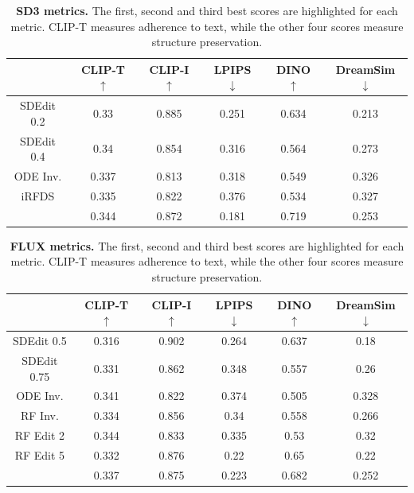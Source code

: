 \begin{table}[h]
\centering
\caption{\textbf{SD3 metrics.} The \colorbox{tabfirst}{first}, \colorbox{tabsecond}{second} and \colorbox{tabthird}{third} best scores are highlighted for each metric. CLIP-T measures adherence to text, while the other four scores measure structure preservation.}
\label{tab:metrics-sd3}
\begin{tabular}{@{}c|c|cccc@{}}
\toprule
 & CLIP-T $\uparrow$ & CLIP-I $\uparrow$ & LPIPS $\downarrow$ & DINO $\uparrow$ & DreamSim $\downarrow$ \\ \midrule
SDEdit 0.2 & 0.33  & \colorbox{tabfirst}{0.885}  & \colorbox{tabsecond}{0.251}  & \colorbox{tabsecond}{0.634} & \colorbox{tabfirst}{0.213}  \\
SDEdit 0.4 & \colorbox{tabsecond}{0.34}  & \colorbox{tabthird}{0.854}  & \colorbox{tabthird}{0.316}  & \colorbox{tabthird}{0.564} & \colorbox{tabthird}{0.273}  \\
ODE Inv. & \colorbox{tabthird}{0.337}  & 0.813  & 0.318  & 0.549  & 0.326  \\
iRFDS & 0.335 & 0.822 & 0.376 & 0.534 & 0.327
\\
\midrule
\textbf{\ours{}} & \colorbox{tabfirst}{0.344} & \colorbox{tabsecond}{0.872} & \colorbox{tabfirst}{0.181} & \colorbox{tabfirst}{0.719} & \colorbox{tabsecond}{0.253} \\ \bottomrule
\end{tabular}
\end{table}

\begin{table}[h]
\centering
\caption{\textbf{FLUX metrics.} The \colorbox{tabfirst}{first}, \colorbox{tabsecond}{second} and \colorbox{tabthird}{third} best scores are highlighted for each metric. CLIP-T measures adherence to text, while the other four scores measure structure preservation.}
\label{tab:metrics-flux}
\begin{tabular}{@{}c|c|cccc@{}}
\toprule
 & CLIP-T $\uparrow$ & CLIP-I $\uparrow$ & LPIPS $\downarrow$ & DINO $\uparrow$ & DreamSim $\downarrow$ \\ \midrule
SDEdit 0.5 & 0.316  &  \colorbox{tabfirst}{0.902} & \colorbox{tabthird}{0.264}  & \colorbox{tabsecond}{0.637}  & \colorbox{tabfirst}{0.18}  \\
SDEdit 0.75 & 0.331  &  0.862 & 0.348  & 0.557  & 0.26 \\
ODE Inv. & \colorbox{tabsecond}{0.341} & 0.822 & 0.374  & 0.505  &  0.328   \\
RF Inv. & 0.334 & 0.856 & 0.34 & 0.558 & 0.266 \\
RF Edit 2 & \colorbox{tabfirst}{0.344} & 0.833 & 0.335 & 0.53 & 0.32 \\
RF Edit 5 & 0.332 & \colorbox{tabsecond}{0.876} & \colorbox{tabfirst}{0.22} & \colorbox{tabthird}{0.65} & \colorbox{tabsecond}{0.22} \\
\midrule
\textbf{\ours{}} & \colorbox{tabthird}{0.337} & \colorbox{tabthird}{0.875} & \colorbox{tabsecond}{0.223} & \colorbox{tabfirst}{0.682} & \colorbox{tabthird}{0.252} \\
\bottomrule
\end{tabular}
\end{table}

